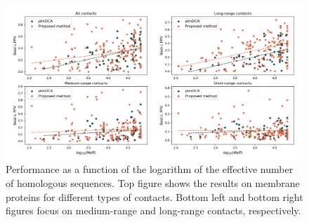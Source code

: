    \begin{figure}[H]
        \begin{center}
            \includegraphics[width=\textwidth, keepaspectratio]{imgs/Meff_membrane.png}
            \caption{Performance as a function of the logarithm of the effective
            number of homologous sequences. Top figure shows the results on
            membrane proteins for different types of contacts. Bottom left and bottom right figures
            focus on medium-range and long-range contacts, respectively.}
            \label{sensitivity}
        \end{center}
    \end{figure}
